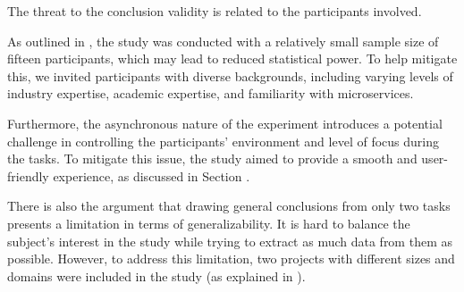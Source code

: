 The threat to the conclusion validity is related to the participants involved.

As outlined in , the study was conducted with a relatively
small sample size of fifteen participants, which may lead to reduced
statistical power. To help mitigate this, we invited participants with diverse
backgrounds, including varying levels of industry expertise, academic
expertise, and familiarity with microservices.

Furthermore, the asynchronous nature of the experiment introduces a potential
challenge in controlling the participants' environment and level of focus
during the tasks. To mitigate this issue, the study aimed to provide a smooth
and user-friendly experience, as discussed in Section .

There is also the argument that drawing general conclusions from only two tasks
presents a limitation in terms of generalizability. It is hard to balance the
subject's interest in the study while trying to extract as much data from them
as possible. However, to address this limitation, two projects with different
sizes and domains were included in the study (as explained in
).

